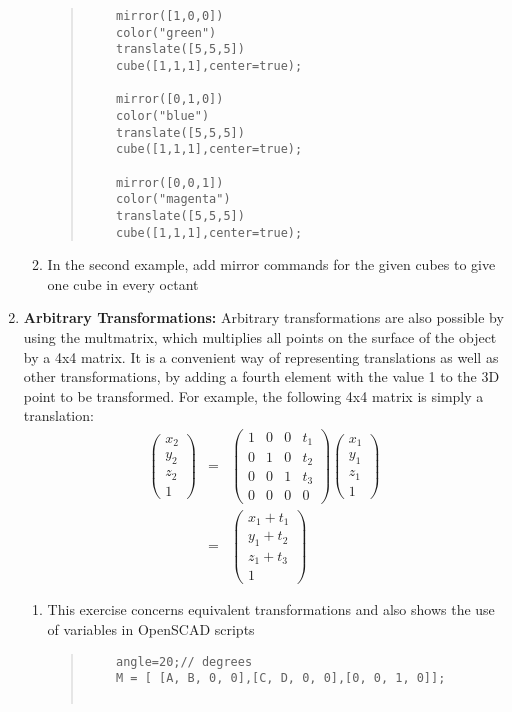 \begin{enumerate}
\begin{enumerate}
\begin{quote}
\begin{verbatim}
    mirror([1,0,0]) 
    color("green") 
    translate([5,5,5]) 
    cube([1,1,1],center=true);
    
    mirror([0,1,0]) 
    color("blue") 
    translate([5,5,5]) 
    cube([1,1,1],center=true);
    
    mirror([0,0,1]) 
    color("magenta") 
    translate([5,5,5]) 
    cube([1,1,1],center=true);
 \end{verbatim}
 \end{quote}
 \item In the second example, add mirror commands for the given cubes to give one cube in every octant
 \end{enumerate}

 \item \textbf{Arbitrary Transformations:} Arbitrary transformations are also possible by using the multmatrix, which multiplies all points on the surface of the object by a 4x4 matrix. It is a convenient way of representing translations as well as other transformations, by adding a fourth element with the value 1 to the 3D point to be transformed. For example, the following 4x4 matrix is simply a translation:
 \begin{eqnarray}
  \begin{pmatrix} x_{2} \\ y_{2} \\ z_{2} \\ 1 \end{pmatrix} & = &  \begin{pmatrix} 1 & 0 & 0 & t_{1} \\ 0 & 1 & 0 & t_{2} \\ 0 & 0 & 1 & t_{3} \\0 & 0 & 0 & 0 \end{pmatrix} \begin{pmatrix} x_{1} \\ y_{1} \\ z_{1} \\ 1 \end{pmatrix} \\
  & = &  \begin{pmatrix} x_{1} + t_{1} \\ y_{1} + t_{2} \\ z_{1} + t_{3} \\ 1 \end{pmatrix} 
\end{eqnarray}

\begin{enumerate}
 \item This exercise concerns equivalent transformations and also shows the use of variables in OpenSCAD scripts 
 \begin{quote}
 \begin{verbatim}
	angle=20;// degrees
	M = [ [A, B, 0, 0],[C, D, 0, 0],[0, 0, 1, 0]];
	

\end{verbatim}
\end{quote}
\end{enumerate}
\end{enumerate}
